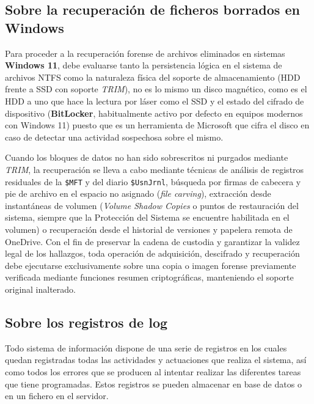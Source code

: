 \subsection{Sobre la recuperación de ficheros borrados en Windows}
Para proceder a la recuperación forense de archivos eliminados en sistemas \textbf{Windows 11}, debe evaluarse tanto la persistencia lógica en el sistema de archivos NTFS como la naturaleza física del soporte de almacenamiento (HDD frente a SSD con soporte \textit{TRIM}), no es lo mismo un disco magnético, como es el HDD a uno que hace la lectura por láser como el SSD y el estado del cifrado de dispositivo (\textbf{BitLocker}, habitualmente activo por defecto en equipos modernos con Windows 11) puesto que es un herramienta de Microsoft que cifra el disco en caso de detectar una actividad sospechosa sobre el mismo.

Cuando los bloques de datos no han sido sobrescritos ni purgados mediante \textit{TRIM}, la recuperación se lleva a cabo mediante técnicas de análisis de registros residuales de la \texttt{\$MFT} y del diario \texttt{\$UsnJrnl}, búsqueda por firmas de cabecera y pie de archivo en el espacio no asignado (\textit{file carving}), extracción desde instantáneas de volumen (\textit{Volume Shadow Copies} o puntos de restauración del sistema, siempre que la Protección del Sistema se encuentre habilitada en el volumen) o recuperación desde el historial de versiones y papelera remota de OneDrive. Con el fin de preservar la cadena de custodia y garantizar la validez legal de los hallazgos, toda operación de adquisición, descifrado y recuperación debe ejecutarse exclusivamente sobre una copia o imagen forense previamente verificada mediante funciones resumen criptográficas, manteniendo el soporte original inalterado.
\newpage
\subsection{Sobre los registros de log}
Todo sistema de información dispone de una serie de registros en los cuales quedan registradas todas las actividades y actuaciones que realiza el sistema, así como todos los errores que se producen al intentar realizar las diferentes tareas que tiene programadas. Estos registros se pueden almacenar en base de datos o en un fichero en el servidor.

